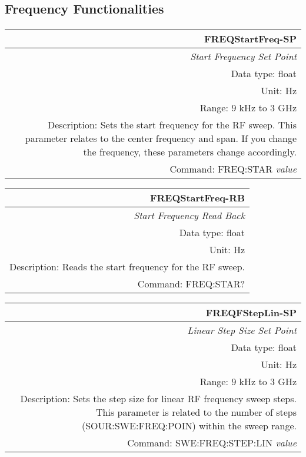 \documentclass[openany]{article}
\begin{document}
	\subsection{Frequency Functionalities}\label{pvgroup:function} %

	\paragraph{}

		\begin{tabular}{N}
			\hline
			\bfseries FREQStartFreq-SP \\ \hline
			\emph{Start Frequency Set Point} \\
			Data type: float \\
			Unit: Hz \\
			Range: 9 kHz to 3 GHz \\
			Description: Sets the start frequency for the RF sweep. This parameter relates to the center frequency and span. If you change the frequency, these parameters change accordingly. \\
			Command: FREQ:STAR \emph{value} \\
			
		\end{tabular}


		\begin{tabular}{N}
			\hline
			\bfseries FREQStartFreq-RB \\ \hline
			\emph{Start Frequency Read Back} \\
			Data type: float \\
			Unit: Hz \\
			Description: Reads the start frequency for the RF sweep. \\
			Command: FREQ:STAR? \\

		\end{tabular}
%
		\begin{tabular}{N}
			\hline
			\bfseries FREQFStepLin-SP \\ \hline
			\emph{Linear Step Size Set Point} \\
			Data type: float \\
			Unit: Hz \\
			Range: 9 kHz to 3 GHz \\
			Description: Sets the step size for linear RF frequency sweep steps. This parameter is related to the number of steps (SOUR:SWE:FREQ:POIN) within the sweep range. \\
			Command: SWE:FREQ:STEP:LIN \emph{value} \\
			
		\end{tabular}
\end{document}
